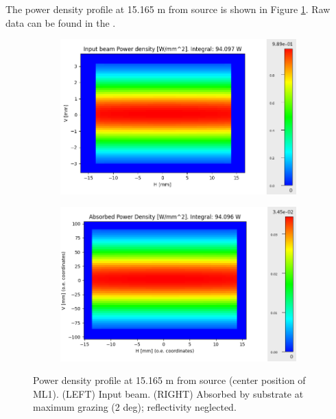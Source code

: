 The power density profile at 15.165 m from source is shown in Figure \ref{fig:power_profile_ML1}. Raw data can be found in the \powerprofilesurl. \\

\begin{figure}[ht]  %
\begin{subfigure}{0.5\textwidth}
\includegraphics[width=\linewidth]{./../../power_profiles/power_profile_ML1.png}
\end{subfigure}
\hfill %
\begin{subfigure}{0.5\textwidth}
\includegraphics[width=\linewidth]{./../../power_profiles/power_profile_ML1_abs_2deg.png}
\end{subfigure}
\caption{\label{fig:power_profile_ML1} Power density profile at 15.165 m from source (center position of ML1). (LEFT) Input beam. (RIGHT) Absorbed by substrate at maximum grazing (2 deg); reflectivity neglected. }
\end{figure}

